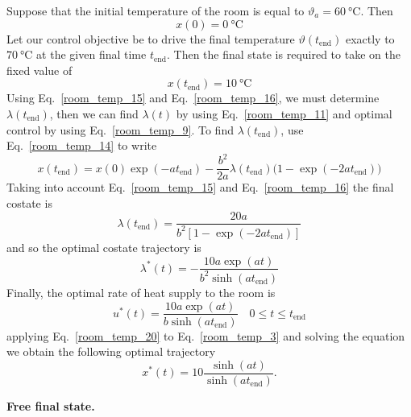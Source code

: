 \documentclass[12pt,a4paper,oneside]{book}
\begin{document}
\begin{onehalfspace}
\begin{example}
	Suppose that the initial temperature of the room is equal to 
	$\vartheta_a=\SI{60}{\celsius}$. Then
	\begin{equation}\label{room_temp_15}
		x(0)=\SI{0}{\celsius}
	\end{equation}
	Let our control objective be to drive the final temperature 
	$\vartheta(t_\text{end})$ 
	exactly to $\SI{70}{\celsius}$ at the given final time $t_\text{end}$. Then 
	the final 
	state is required to take on the fixed value of 
	\begin{equation}\label{room_temp_16}
		x(t_\text{end})=\SI{10}{\celsius}
	\end{equation}
	Using Eq.~\eqref{room_temp_15} and Eq.~\eqref{room_temp_16}, we must 
	determine $\lambda(t_\text{end})$, then we can find $\lambda(t)$ by using 
	Eq.~\eqref{room_temp_11} and optimal control by using 
	Eq.~\eqref{room_temp_9}. To find $\lambda(t_\text{end})$, use 
	Eq.~\eqref{room_temp_14} 
	to write
	\begin{equation}\label{room_temp_17}
		x(t_\text{end})=x(0)\exp(-at_\text{end})-\frac{b^2}{2a} 
		\lambda(t_\text{end})\Big(1-\exp(-2at_\text{end})\Big)
	\end{equation}
	Taking into account Eq.~\eqref{room_temp_15} and Eq.~\eqref{room_temp_16} 
	the final costate is 
	\begin{equation}\label{room_temp_18}
		\lambda(t_\text{end}) = \frac{20a}{b^2[1-\exp(-2at_\text{end})]}
	\end{equation}
	and so the optimal costate trajectory is
	\begin{equation}\label{room_temp_19}
		\lambda^*(t) = -\frac{10a\exp(at)}{b^2\sinh(at_\text{end})}
	\end{equation}
	Finally, the optimal rate of heat supply to the room is
	\begin{equation}\label{room_temp_20}
		u^*(t) = \frac{10a\exp(at)}{b\sinh(at_\text{end})}\quad 0 \le t \le t_\text{end}
	\end{equation}
	applying Eq.~\eqref{room_temp_20} to Eq.~\eqref{room_temp_3} and solving 
	the equation we obtain the following optimal trajectory
	\begin{equation}\label{room_temp_21}
		x^*(t) = 10\frac{\sinh(at)}{\sinh(at_\text{end})}.
	\end{equation}
	
	\noindent\textbf{Free final state.}
	

\end{example}
\end{onehalfspace}
\end{document}
